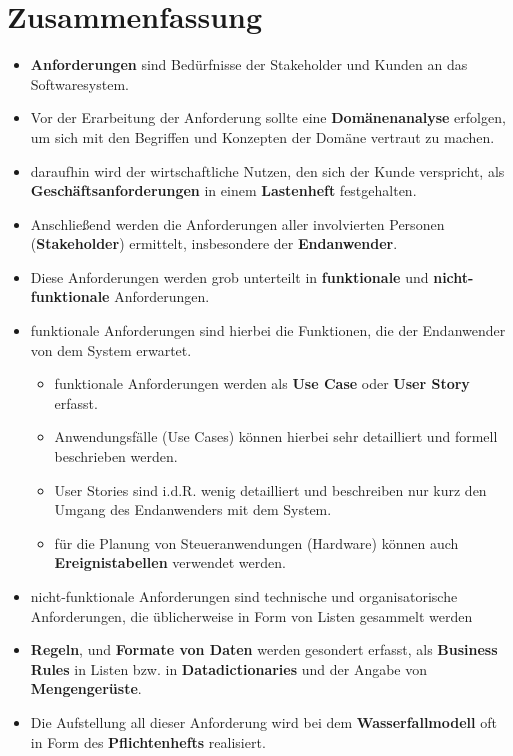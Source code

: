 \section{Zusammenfassung}



\begin{itemize}
    \item \textbf{Anforderungen} sind Bedürfnisse der Stakeholder und Kunden an das Softwaresystem.
    \item Vor der Erarbeitung der Anforderung sollte eine \textbf{Domänenanalyse} erfolgen, um sich mit den Begriffen und Konzepten der Domäne vertraut zu machen.
    \item daraufhin wird der wirtschaftliche Nutzen, den sich der Kunde verspricht, als \textbf{Geschäftsanforderungen} in einem \textbf{Lastenheft} festgehalten.
    \item Anschließend werden die Anforderungen aller involvierten Personen (\textbf{Stakeholder}) ermittelt, insbesondere der \textbf{Endanwender}.
    \item Diese Anforderungen werden grob unterteilt in \textbf{funktionale} und \textbf{nicht-funktionale} Anforderungen.
    \item funktionale Anforderungen sind hierbei die Funktionen, die der Endanwender von dem System erwartet.
        \begin{itemize}
            \item funktionale Anforderungen werden als \textbf{Use Case} oder \textbf{User Story} erfasst.
            \item Anwendungsfälle (Use Cases) können hierbei sehr detailliert und formell beschrieben werden.
            \item User Stories sind i.d.R. wenig detailliert und beschreiben nur kurz den Umgang des Endanwenders mit dem System.
            \item für die Planung von Steueranwendungen (Hardware) können auch \textbf{Ereignistabellen} verwendet werden.
        \end{itemize}
    \item nicht-funktionale Anforderungen sind technische und organisatorische Anforderungen, die üblicherweise in Form von Listen gesammelt werden
    \item \textbf{Regeln}, und \textbf{Formate von Daten} werden gesondert erfasst, als \textbf{Business Rules} in Listen bzw. in \textbf{Datadictionaries} und der Angabe von \textbf{Mengengerüste}.
    \item Die Aufstellung all dieser Anforderung wird bei dem \textbf{Wasserfallmodell} oft in Form des \textbf{Pflichtenhefts} realisiert.
\end{itemize}


